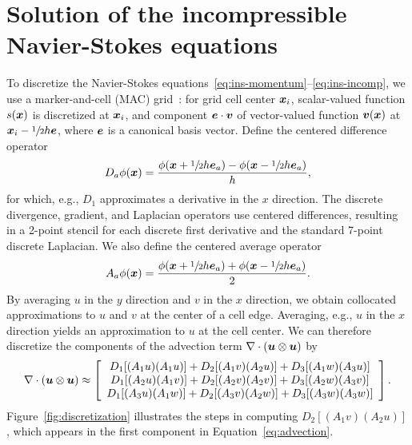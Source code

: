 \section{Solution of the incompressible Navier-Stokes equations}\label{sec:discretization}



To discretize the Navier-Stokes equations~\eqref{eq:ins-momentum}--\eqref{eq:ins-incomp},
we use a marker-and-cell (MAC) grid~\cite{Welch:1965jv}: for grid cell center $\boldsymbol{x}_i$,
scalar-valued function $s(\boldsymbol{x})$ is discretized at $\boldsymbol{x}_i$, and component $\boldsymbol{e}\cdot\boldsymbol{v}$
of vector-valued function $\boldsymbol{v}(\boldsymbol{x})$ at $\boldsymbol{x}_i - \sfrac12h\boldsymbol{e}$, where $\boldsymbol{e}$ is a
canonical basis vector. Define the centered difference operator
\begin{equation*}
    D_a\phi(\boldsymbol{x}) = \frac{\phi(\boldsymbol{x}+\sfrac12 h\boldsymbol{e}_a) - \phi(\boldsymbol{x}-\sfrac12 h\boldsymbol{e}_a)}{h},
\end{equation*}
for which, e.g., $D_1$ approximates a derivative in the $x$ direction. The discrete
divergence, gradient, and Laplacian operators use centered differences, resulting in a
2-point stencil for each discrete first derivative and the standard 7-point discrete
Laplacian. We also define the centered average operator
\begin{equation*}
    A_a\phi(\boldsymbol{x}) = \frac{\phi(\boldsymbol{x}+\sfrac12 h\boldsymbol{e}_a) + \phi(\boldsymbol{x}-\sfrac12 h\boldsymbol{e}_a)}2.
\end{equation*}
By averaging $u$ in the $y$ direction and $v$ in the $x$ direction, we obtain collocated
approximations to $u$ and $v$ at the center of a cell edge. Averaging, e.g., $u$ in the
$x$ direction yields an approximation to $u$ at the cell center. We can therefore
discretize the components of the advection term $\div(\u\otimes\u)$ by
\begin{equation}
    \div(\u\otimes\u) \approx %
    \left[\begin{array}{c}
            D_1[(A_1 u) (A_1 u)] + D_2[(A_1 v) (A_2 u)] + D_3[(A_1 w) (A_3 u)] \\
            D_1[(A_2 u) (A_1 v)] + D_2[(A_2 v) (A_2 v)] + D_3[(A_2 w) (A_3 v)] \\
            D_1[(A_3 u) (A_1 w)] + D_2[(A_3 v) (A_2 w)] + D_3[(A_3 w) (A_3 w)]
        \end{array}\right].
        \label{eq:advection}
\end{equation}
Figure~\ref{fig:discretization} illustrates the steps in computing $D_2[(A_1 v)(A_2 u)]$,
which appears in the first component in Equation~\eqref{eq:advection}. 

